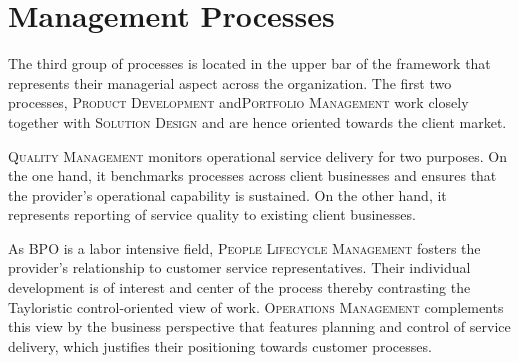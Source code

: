 	
	
	
	
	
	
	
	
	
	
	
	
	
	
	\section{Management Processes}
	
	The third group of processes is located in the upper bar of the framework that represents their managerial aspect across the organization. The first two processes, \textsc{Product Development} and\textsc{Portfolio Management} work closely together with \textsc{Solution Design} and are hence oriented towards the client market. 
	
	\textsc{Quality Management} monitors operational service delivery for two purposes. On the one hand, it benchmarks processes across client businesses and ensures that the provider's operational capability is sustained. On the other hand, it represents reporting of service quality to existing client businesses.
	
	As \acrshort{BPO} is a labor intensive field, \textsc{People Lifecycle Management} fosters the provider's relationship to customer service representatives. Their individual development is of interest and center of the process thereby contrasting the Tayloristic control-oriented view of work. \textsc{Operations Management} complements this view by the business perspective that features planning and control of service delivery, which justifies their positioning towards customer processes. 
	
